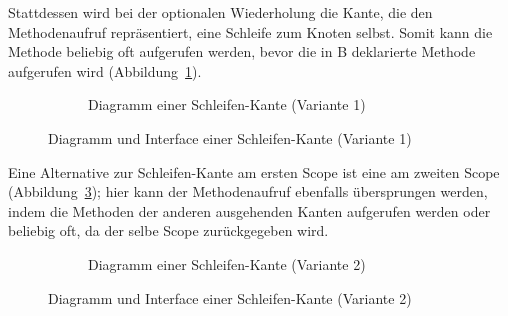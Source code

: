 \documentclass[../InterneDSLs.tex]{subfiles}
\begin{document}
Stattdessen wird bei der optionalen Wiederholung die Kante, die den Methodenaufruf repräsentiert, eine Schleife zum Knoten selbst. Somit kann die Methode beliebig oft aufgerufen werden, bevor die in B deklarierte Methode aufgerufen wird (Abbildung~\ref{FIG:DiagramLoopNode}).
\begin{figure}[ht]
\centering
  \begin{subfigure}[c]{0.49\textwidth}
    \caption{Diagramm einer Schleifen-Kante (Variante 1)}
    \label{FIG:DiagramLoopNode}
  \end{subfigure}
  \begin{subfigure}[c]{0.49\textwidth}
    
  \end{subfigure}
  \caption{Diagramm und Interface einer Schleifen-Kante (Variante 1)}
  \label{FIG:LoopNode}
\end{figure}

Eine Alternative zur Schleifen-Kante am ersten Scope ist eine am zweiten Scope (Abbildung~\ref{FIG:DiagramLoopNodeAlternative}); hier kann der Methodenaufruf ebenfalls übersprungen werden, indem die Methoden der anderen ausgehenden Kanten aufgerufen werden oder beliebig oft, da der selbe Scope zurückgegeben wird.
\begin{figure}[ht]
\centering
  \begin{subfigure}[c]{0.49\textwidth}
    \caption{Diagramm einer Schleifen-Kante (Variante 2)}
    \label{FIG:DiagramLoopNodeAlternative}
  \end{subfigure}
  \begin{subfigure}[c]{0.49\textwidth}
    
  \end{subfigure}
  \caption{Diagramm und Interface einer Schleifen-Kante (Variante 2)}
  \label{FIG:LoopNodeAlternative}
\end{figure}
\end{document}
